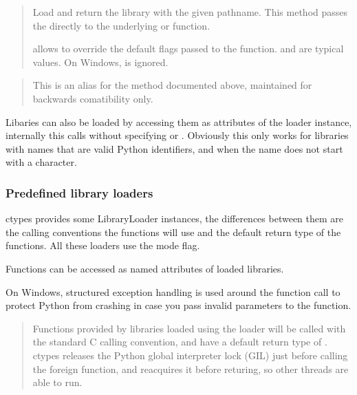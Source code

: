 \begin{quote}

Load and return the library with the given pathname.  This method
passes the  directly to the underlying  or
 function.

 allows to override the default flags passed to the
 function.   and  are
typical values.  On Windows,  is ignored.
\end{quote}

\begin{quote}

This is an alias for the  method documented above,
maintained for backwards comatibility only.
\end{quote}

Libaries can also be loaded by accessing them as attributes of the
loader instance, internally this calls  without
specifying  or .  Obviously this only works for
libraries with names that are valid Python identifiers, and when the
name does not start with a \code{{\_}} character.


\subsubsection{Predefined library loaders\label{ctypes-predefined-library-loaders}}

ctypes provides some LibraryLoader instances, the differences between
them are the calling conventions the functions will use and the
default return type of the functions.  All these loaders use the
 mode flag.

Functions can be accessed as named attributes of loaded libraries.

On Windows, structured exception handling is used around the function
call to protect Python from crashing in case you pass invalid
parameters to the function.

\begin{quote}

Functions provided by libraries loaded using the  loader
will be called with the standard C calling convention, and have a
default return type of .  ctypes releases the Python global
interpreter lock (GIL) just before calling the foreign function,
and reacquires it before returing, so other threads are able to
run.
\end{quote}

